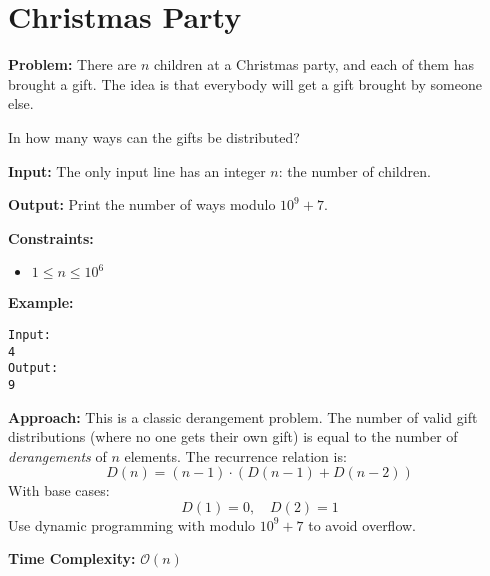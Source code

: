 \documentclass{article}
\begin{document}
\section{Christmas Party}

\textbf{Problem:}  
There are $n$ children at a Christmas party, and each of them has brought a gift.  
The idea is that everybody will get a gift brought by someone else.  

In how many ways can the gifts be distributed?

\textbf{Input:}  
The only input line has an integer $n$: the number of children.

\textbf{Output:}  
Print the number of ways modulo $10^9 + 7$.

\textbf{Constraints:}
\begin{itemize}
    \item $1 \le n \le 10^6$
\end{itemize}

\textbf{Example:}
\begin{verbatim}
Input:
4
Output:
9
\end{verbatim}

\textbf{Approach:}  
This is a classic derangement problem. The number of valid gift distributions (where no one gets their own gift) is equal to the number of \textit{derangements} of $n$ elements.  
The recurrence relation is:  
\[
D(n) = (n - 1) \cdot (D(n - 1) + D(n - 2))
\]  
With base cases:  
\[
D(1) = 0, \quad D(2) = 1
\]  
Use dynamic programming with modulo $10^9 + 7$ to avoid overflow.

\textbf{Time Complexity:} $\mathcal{O}(n)$
\end{document}
